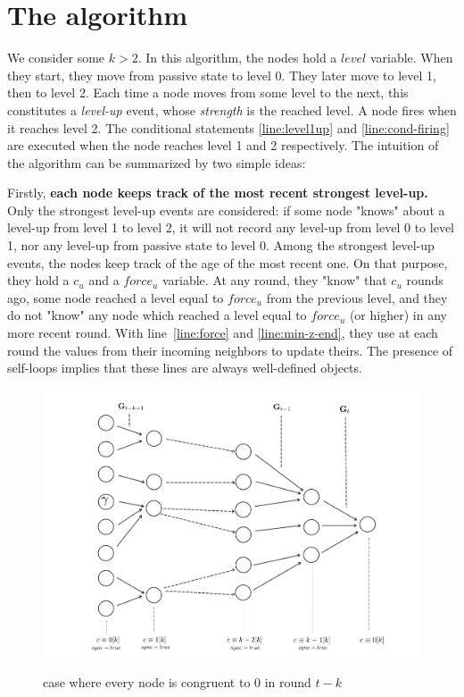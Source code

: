 \documentclass[11pt,letterpaper]{article}
\begin{document}
\section{The algorithm}

We consider some $k > 2$.
In this algorithm, the nodes hold a $level$ variable. When they start, they move from passive state to level 0. They later move to level 1, then to level 2.
Each time a node moves from some level to the next, this constitutes a \textit{level-up} event, whose \textit{strength} is the reached level.
A node fires when it reaches level 2.
The conditional statements \ref{line:level1up} and \ref{line:cond-firing} are executed when the node reaches level 1 and 2 respectively.
The intuition of the algorithm can be summarized by two simple ideas:

Firstly, \textbf{each node keeps track of the most recent strongest level-up.}
Only the strongest level-up events are considered: if some node "knows" about a level-up from level 1 to level 2,
it will not record any level-up from level 0 to level 1, nor any level-up from passive state to level 0.
Among the strongest level-up events, the nodes keep track of the age of the most recent one.
On that purpose, they hold a $c_u$ and a $force_u$ variable.
At any round, they "know" that $c_u$ rounds ago, some node reached a level equal to $force_u$ from the previous level,
and they do not "know" any node which reached a level equal to $force_u$ (or higher) in any more recent round.
With line~\ref{line:force} and \ref{line:min-z-end}, they use at each round the values from their incoming neighbors to update theirs.
The presence of self-loops implies that these lines are always well-defined objects.

\begin{figure}[h!]
	\centering
	\caption{case where every node is congruent to 0 in round $t-k$}
	\includegraphics[width=0.7\columnwidth]{illustration-conc-1}
	\label{fig:fig1}
\end{figure}
\end{document}
